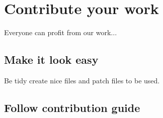 \chapter{Contribute your work}\label{contrib}

Everyone can profit from our work... \todo{}

\section{Make it look easy}

Be tidy create nice files and patch files to be used.

\section{Follow contribution guide}


